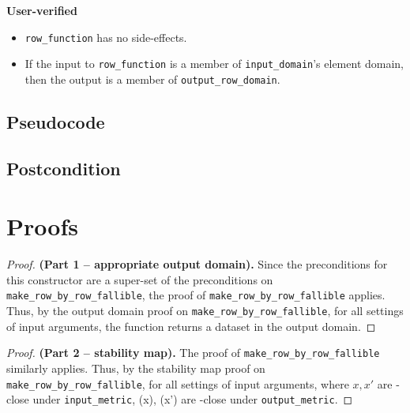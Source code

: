 \documentclass{article}
\begin{document}
\textbf{User-verified} 
\begin{itemize} 
    \item \texttt{row\_function} has no side-effects. 
    \item If the input to \texttt{row\_function} is a member of \texttt{input\_domain}'s element domain,  
    then the output is a member of \texttt{output\_row\_domain}. 
\end{itemize} 
 
 
\subsection*{Pseudocode} 
 
 
\subsection*{Postcondition} 
 
\section{Proofs} 
 
\begin{proof} \textbf{(Part 1 -- appropriate output domain).} 
    Since the preconditions for this constructor are a super-set of the preconditions on \texttt{make\_row\_by\_row\_fallible},  
    the proof of \texttt{make\_row\_by\_row\_fallible} applies.  
    Thus, by the output domain proof on \texttt{make\_row\_by\_row\_fallible},  
    for all settings of input arguments, the function returns a dataset in the output domain. 
\end{proof} 
 
\begin{proof} \textbf{(Part 2 -- stability map).}  
    The proof of \texttt{make\_row\_by\_row\_fallible} similarly applies.  
    Thus, by the stability map proof on \texttt{make\_row\_by\_row\_fallible},  
    for all settings of input arguments,  
    where $x, x'$ are \din-close under \texttt{input\_metric}, 
    \function(x), \function(x') are \dout-close under \texttt{output\_metric}. 
\end{proof} 
 
\end{document}
